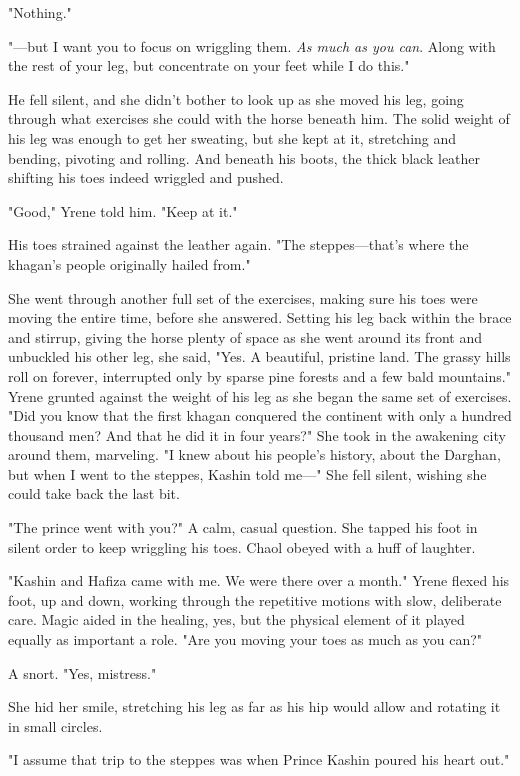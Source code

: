 "Nothing."

"---but I want you to focus on wriggling them. \emph{As much as you can}. Along with the rest of your leg, but concentrate on your feet while I do this."

He fell silent, and she didn't bother to look up as she moved his leg, going through what exercises she could with the horse beneath him. The solid weight of his leg was enough to get her sweating, but she kept at it, stretching and bending, pivoting and rolling. And beneath his boots, the thick black leather shifting  his toes indeed wriggled and pushed.

"Good," Yrene told him. "Keep at it."

His toes strained against the leather again. "The steppes---that's where the khagan's people originally hailed from."

She went through another full set of the exercises, making sure his toes were moving the entire time, before she answered. Setting his leg back within the brace and stirrup, giving the horse plenty of space as she went around its front and unbuckled his other leg, she said, "Yes. A beautiful, pristine land. The grassy hills roll on forever, interrupted only by sparse pine forests and a few bald mountains." Yrene grunted against the weight of his leg as she began the same set of exercises. "Did you know that the first khagan conquered the continent with only a hundred thousand men? And that he did it in four years?" She took in the awakening city around them, marveling. "I knew about his people's history, about the Darghan, but when I went to the steppes, Kashin told me---" She fell silent, wishing she could take back the last bit.

"The prince went with you?" A calm, casual question. She tapped his foot in silent order to keep wriggling his toes. Chaol obeyed with a huff of laughter.

"Kashin and Hafiza came with me. We were there over a month." Yrene flexed his foot, up and down, working through the repetitive motions with slow, deliberate care. Magic aided in the healing, yes, but the physical element of it played equally as important a role. "Are you moving your toes as much as you can?"

A snort. "Yes, mistress."

She hid her smile, stretching his leg as far as his hip would allow and rotating it in small circles.

"I assume that trip to the steppes was when Prince Kashin poured his heart out."

